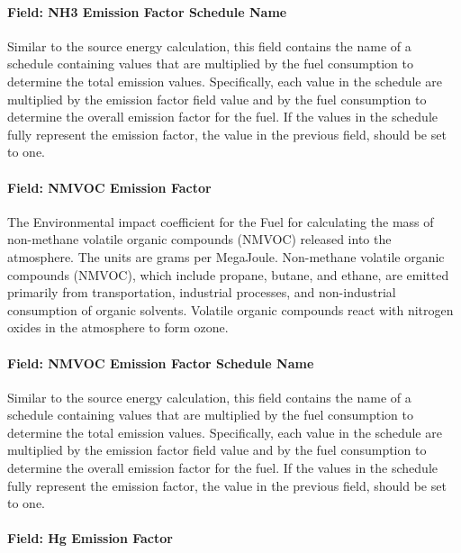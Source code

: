 \paragraph{Field: NH3 Emission Factor Schedule Name}\label{field-nh3-emission-factor-schedule-name}

Similar to the source energy calculation, this field contains the name of a schedule containing values that are multiplied by the fuel consumption to determine the total emission values. Specifically, each value in the schedule are multiplied by the emission factor field value and by the fuel consumption to determine the overall emission factor for the fuel. If the values in the schedule fully represent the emission factor, the value in the previous field, should be set to one.

\paragraph{Field: NMVOC Emission Factor}\label{field-nmvoc-emission-factor}

The Environmental impact coefficient for the Fuel for calculating the mass of non-methane volatile organic compounds (NMVOC) released into the atmosphere. The units are grams per MegaJoule. Non-methane volatile organic compounds (NMVOC), which include propane, butane, and ethane, are emitted primarily from transportation, industrial processes, and non-industrial consumption of organic solvents. Volatile organic compounds react with nitrogen oxides in the atmosphere to form ozone.

\paragraph{Field: NMVOC Emission Factor Schedule Name}\label{field-nmvoc-emission-factor-schedule-name}

Similar to the source energy calculation, this field contains the name of a schedule containing values that are multiplied by the fuel consumption to determine the total emission values. Specifically, each value in the schedule are multiplied by the emission factor field value and by the fuel consumption to determine the overall emission factor for the fuel. If the values in the schedule fully represent the emission factor, the value in the previous field, should be set to one.

\paragraph{Field: Hg Emission Factor}\label{field-hg-emission-factor}

